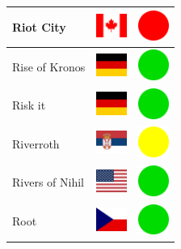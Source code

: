 \documentclass[12pt, a4paper, twoside]{report}
\begin{document}
\begin{center}
\begin{longtable}{|p{5cm}|p{2cm}|p{2cm}|}
 Riot City                                                  & \includegraphics[width=1cm]{../4x3/ca} &   \includegraphics[width=1cm]{../likes/n} \\ \hline
 Rise of Kronos                                             & \includegraphics[width=1cm]{../4x3/de} &   \includegraphics[width=1cm]{../likes/y} \\ \hline
 Risk it                                                    & \includegraphics[width=1cm]{../4x3/de} &   \includegraphics[width=1cm]{../likes/y} \\ \hline
 Riverroth                                                  & \includegraphics[width=1cm]{../4x3/rs} &   \includegraphics[width=1cm]{../likes/m} \\ \hline
 Rivers of Nihil                                            & \includegraphics[width=1cm]{../4x3/us} &   \includegraphics[width=1cm]{../likes/y} \\ \hline
 Root                                                       & \includegraphics[width=1cm]{../4x3/cz} &   \includegraphics[width=1cm]{../likes/y} \\ \hline

\end{longtable}
\end{center}
\end{document}

